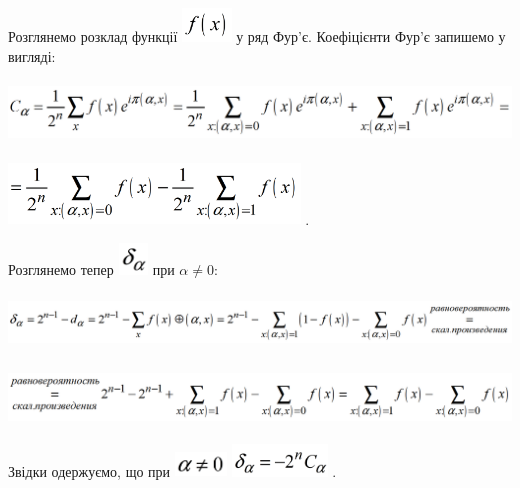 \textcolor[rgb]{0.0,0.5019608,0.0}{Розглянемо} розклад функції 
\includegraphics[width=0.5165in,height=0.3583in]{crypt-img/crypt-img282.png}  у
ряд Фур’є. Коефіцієнти Фур’є запишемо у вигляді:

{\centering 
\includegraphics[width=6.3945in,height=0.6598in]{crypt-img/crypt-img283.png}
\par}

 \includegraphics[width=3.0472in,height=0.6417in]{crypt-img/crypt-img284.png} .

\textcolor[rgb]{0.0,0.5019608,0.0}{Розглянемо} тепер 
\includegraphics[width=0.3091in,height=0.3382in]{crypt-img/crypt-img285.png} 
при  $\alpha \neq 0$:

{\centering 
\includegraphics[width=6.8465in,height=0.5835in]{crypt-img/crypt-img286.png}
\par}

 \includegraphics[width=6.3in,height=0.5965in]{crypt-img/crypt-img287.png} 

\textcolor[rgb]{0.0,0.5019608,0.0}{Звідки}
\textcolor[rgb]{0.0,0.5019608,0.0}{одержуємо}, що при 
\includegraphics[width=0.5484in,height=0.261in]{crypt-img/crypt-img288.png} 
\includegraphics[width=0.9957in,height=0.339in]{crypt-img/crypt-img289.png} . 

